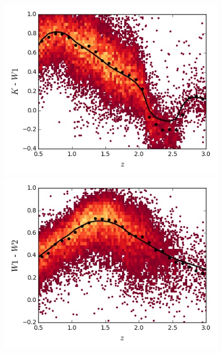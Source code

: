 \begin{figure}
\begin{minipage}[b]{0.49\textwidth}
    \includegraphics[width=\textwidth]{figures/chapter06/sed_color_plots/kw1.jpg}
  \end{minipage}
  \begin{minipage}[b]{0.49\textwidth}
    \includegraphics[width=\textwidth]{figures/chapter06/sed_color_plots/w1w2.jpg}
  \end{minipage} \\
\begin{minipage}[b]{0.49\textwidth}

\end{minipage}
\end{figure}
